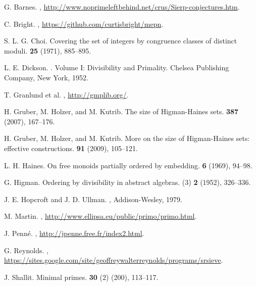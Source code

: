 \documentclass[12pt]{article}
\theoremstyle{plain}
\theoremstyle{definition}
\theoremstyle{remark}
\newcommand{\0}{\mathtt{0}}
\newcommand{\1}{\mathtt{1}}
\newcommand{\2}{\mathtt{2}}
\newcommand{\3}{\mathtt{3}}
\newcommand{\4}{\mathtt{4}}
\newcommand{\5}{\mathtt{5}}
\newcommand{\6}{\mathtt{6}}
\newcommand{\7}{\mathtt{7}}
\newcommand{\8}{\mathtt{8}}
\newcommand{\9}{\mathtt{9}}
\begin{document}

\begin{thebibliography}{10}

  G. Barnes.
,
\url{http://www.noprimeleftbehind.net/crus/Sierp-conjectures.htm}.

  C. Bright.
,
\url{https://github.com/curtisbright/mepn}.

  S. L. G. Choi.
\newblock Covering the set of integers by congruence 
classes of distinct moduli.
 {\bf 25} (1971), 885--895.

L. E. Dickson.
.
\newblock Volume I:  Divisibility and Primality.
\newblock Chelsea Publishing Company, New York, 1952.

  T. Granlund et al.
,
\url{http://gmplib.org/}.

  H. Gruber, M. Holzer, and M. Kutrib.
\newblock The size of Higman-Haines sets.
 {\bf 387} (2007), 167--176.

  H. Gruber, M. Holzer, and M. Kutrib.
\newblock More on the size of Higman-Haines sets:  effective constructions.
 {\bf 91} (2009), 105--121.

  L. H. Haines.
\newblock On free monoids partially ordered by embedding.
 {\bf 6} (1969), 94--98.

  G. Higman.
\newblock Ordering by divisibility in abstract algebras.
 (3) {\bf 2} (1952), 326--336.

  J. E. Hopcroft and J. D. Ullman.
,
Addison-Wesley, 1979.

  M. Martin.
,
\url{http://www.ellipsa.eu/public/primo/primo.html}.

  J. Penn\'e.
,
\url{http://jpenne.free.fr/index2.html}.

  G. Reynolds.
,
\url{https://sites.google.com/site/geoffreywalterreynolds/programs/srsieve}.

  J. Shallit.
\newblock Minimal primes.
 {\bf 30} (2) (200), 113--117.

\end{thebibliography}
\end{document}
